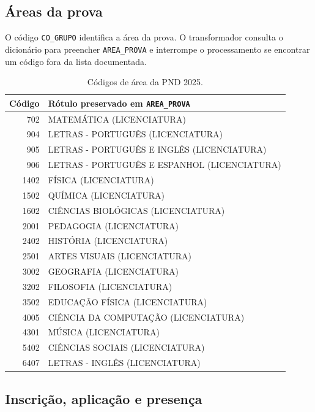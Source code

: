 \subsection{Áreas da prova}

O código \texttt{CO\_GRUPO} identifica a área da prova. O transformador consulta o dicionário para preencher \texttt{AREA\_PROVA} e interrompe o processamento se encontrar um código fora da lista documentada.

\begin{table}[H]
\centering
\scriptsize
\caption{Códigos de área da PND 2025.}
\label{tab:ap-areas-pnd}
\renewcommand{\arraystretch}{1.08}
\begin{tabular}{|r|p{11.5cm}|}
\hline
\textbf{Código} & \textbf{Rótulo preservado em \texttt{AREA\_PROVA}} \\ \hline
702 & MATEMÁTICA (LICENCIATURA) \\ \hline
904 & LETRAS - PORTUGUÊS (LICENCIATURA) \\ \hline
905 & LETRAS - PORTUGUÊS E INGLÊS (LICENCIATURA) \\ \hline
906 & LETRAS - PORTUGUÊS E ESPANHOL (LICENCIATURA) \\ \hline
1402 & FÍSICA (LICENCIATURA) \\ \hline
1502 & QUÍMICA (LICENCIATURA) \\ \hline
1602 & CIÊNCIAS BIOLÓGICAS (LICENCIATURA) \\ \hline
2001 & PEDAGOGIA (LICENCIATURA) \\ \hline
2402 & HISTÓRIA (LICENCIATURA) \\ \hline
2501 & ARTES VISUAIS (LICENCIATURA) \\ \hline
3002 & GEOGRAFIA (LICENCIATURA) \\ \hline
3202 & FILOSOFIA (LICENCIATURA) \\ \hline
3502 & EDUCAÇÃO FÍSICA (LICENCIATURA) \\ \hline
4005 & CIÊNCIA DA COMPUTAÇÃO (LICENCIATURA) \\ \hline
4301 & MÚSICA (LICENCIATURA) \\ \hline
5402 & CIÊNCIAS SOCIAIS (LICENCIATURA) \\ \hline
6407 & LETRAS - INGLÊS (LICENCIATURA) \\ \hline
\end{tabular}
\end{table}

\subsection{Inscrição, aplicação e presença}


